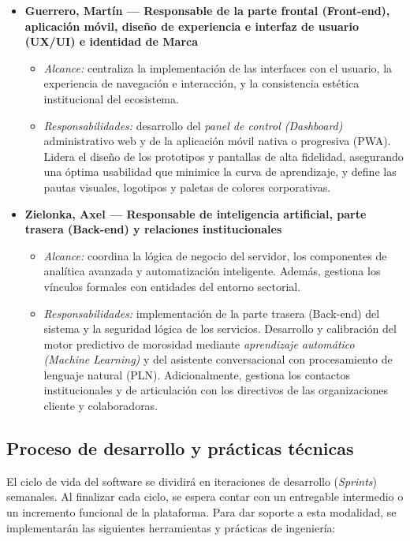 \begin{itemize}
    \item \textbf{Guerrero, Martín — Responsable de la parte frontal (Front-end), aplicación móvil, diseño de experiencia e interfaz de usuario (UX/UI) e identidad de Marca}
    \begin{itemize}
        \item \textit{Alcance:} centraliza la implementación de las interfaces con el usuario, la experiencia de navegación e interacción, y la consistencia estética institucional del ecosistema.
        \item \textit{Responsabilidades:} desarrollo del \textit{panel de control (Dashboard)} administrativo web y de la aplicación móvil nativa o progresiva (PWA). Lidera el diseño de los prototipos y pantallas de alta fidelidad, asegurando una óptima usabilidad que minimice la curva de aprendizaje, y define las pautas visuales, logotipos y paletas de colores corporativas.
    \end{itemize}
    
    \item \textbf{Zielonka, Axel — Responsable de inteligencia artificial, parte trasera (Back-end) y relaciones institucionales}
    \begin{itemize}
        \item \textit{Alcance:} coordina la lógica de negocio del servidor, los componentes de analítica avanzada y automatización inteligente. Además, gestiona los vínculos formales con entidades del entorno sectorial.
        \item \textit{Responsabilidades:} implementación de la parte trasera (Back-end) del sistema y la seguridad lógica de los servicios. Desarrollo y calibración del motor predictivo de morosidad mediante \textit{aprendizaje automático (Machine Learning)} y del asistente conversacional con procesamiento de lenguaje natural (PLN). Adicionalmente, gestiona los contactos institucionales y de articulación con los directivos de las organizaciones cliente y colaboradoras.
    \end{itemize}
\end{itemize}

\subsection{Proceso de desarrollo y prácticas técnicas}

El ciclo de vida del software se dividirá en iteraciones de desarrollo (\textit{Sprints}) semanales. Al finalizar cada ciclo, se espera contar con un entregable intermedio o un incremento funcional de la plataforma. Para dar soporte a esta modalidad, se implementarán las siguientes herramientas y prácticas de ingeniería:

